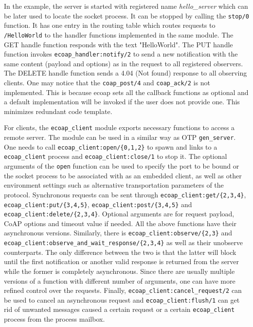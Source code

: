 In the example, the server is started with registered name \textit{hello\_server} which can be later used to locate the socket process. It can be stopped by calling the \verb|stop/0| function. It has one entry in the routing table which routes requests to \verb|/HelloWorld| to the handler functions implemented in the same module. The GET handle function responds with the text "HelloWorld". The PUT handle function invokes \verb|ecoap_handler:notify/2| to send a new notification with the same content (payload and options) as in the request to all registered observers. The DELETE handle function sends a 4.04 (Not found) response to all observing clients. One may notice that the \verb|coap_post/4| and \verb|coap_ack/2| is not implemented. This is because ecoap sets all the callback functions as optional and a default implementation will be invoked if the user does not provide one. This minimizes redundant code template.

For clients, the \verb|ecoap_client| module exports necessary functions to access a remote server. The module can be used in a similar way as OTP \verb|gen_server|. One needs to call \verb|ecoap_client:open/{0,1,2}| to spawn and links to a \verb|ecoap_client| process and \verb|ecoap_client:close/1| to stop it. The optional arguments of the \verb|open| function can be used to specify the port to be bound or the socket process to be associated with as an embedded client, as well as other environment settings such as alternative transportation parameters of the protocol. Synchronous requests can be sent through \verb|ecoap_client:get/{2,3,4}|, \verb|ecoap_client:put/{3,4,5}|, \verb|ecoap_client:post/{3,4,5}| and \verb|ecoap_client:delete/{2,3,4}|. Optional arguments are for request payload, CoAP options and timeout value if needed. All the above functions have their asynchronous versions. Similarly, there is \verb|ecoap_client:observe/{2,3}| and \verb|ecoap_client:observe_and_wait_response/{2,3,4}|  as well as their unobserve counterparts. The only difference between the two is that the latter will block until the first notification or another valid response is returned from the server while the former is completely asynchronous. Since there are usually multiple versions of a function with different number of arguments, one can have more refined control over the requests. Finally, \verb|ecoap_client:cancel_request/2| can be used to cancel an asynchronous request and \verb|ecoap_client:flush/1| can get rid of unwanted messages caused a certain request or a certain \verb|ecoap_client| process from the process mailbox. 

